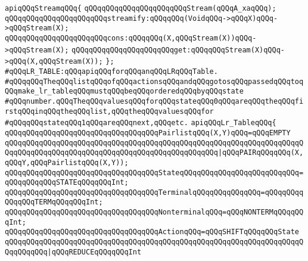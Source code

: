 \verb|apiqQQqStreamqQQq{|\newline
\newline
\verb|qQQqqQQqqQQqqQQqqQQqqQQqStream(qQQqA_xaqQQq);|\newline
\newline
\verb|qQQqqQQqqQQqqQQqqQQqqQQqstreamify:qQQqqQQq(VoidqQQq->qQQqX)qQQq->qQQqStream(X);|\newline
\verb|qQQqqQQqqQQqqQQqqQQqqQQqcons:qQQqqQQq(X,qQQqStream(X))qQQq->qQQqStream(X);|\newline
\verb|qQQqqQQqqQQqqQQqqQQqqQQqget:qQQqqQQqStream(X)qQQq->qQQq(X,qQQqStream(X));|\newline
\verb|};|\newline
\newline
\verb|#qQQqLR_TABLE:qQQqapiqQQqforqQQqanqQQqLRqQQqTable.|\newline
\verb|#qQQqqQQqTheqQQqlistqQQqofqQQqactionsqQQqandqQQqgotosqQQqpassedqQQqtoqQQqmake_lr_tableqQQqmustqQQqbeqQQqorderedqQQqbyqQQqstate|\newline
\verb|#qQQqnumber.qQQqTheqQQqvaluesqQQqforqQQqstateqQQq0qQQqareqQQqtheqQQqfirstqQQqinqQQqtheqQQqlist,qQQqtheqQQqvaluesqQQqfor|\newline
\verb|#qQQqqQQqstateqQQq1qQQqareqQQqnext,qQQqetc.|\newline
\newline
\newline
\verb|apiqQQqLr_TableqQQq{|\newline
\newline
\verb|qQQqqQQqqQQqqQQqqQQqqQQqqQQqqQQqqQQqPairlistqQQq(X,Y)qQQq=qQQqEMPTY|\newline
\verb|qQQqqQQqqQQqqQQqqQQqqQQqqQQqqQQqqQQqqQQqqQQqqQQqqQQqqQQqqQQqqQQqqQQqqQQqqQQqqQQqqQQqqQQqqQQqqQQqqQQqqQQqqQQqqQQqqQQqqQQq|\verb#|qQQqPAIRqQQqqQQq(X,qQQqY,qQQqPairlistqQQq(X,Y));#\newline
\newline
\verb|qQQqqQQqqQQqqQQqqQQqqQQqqQQqqQQqqQQqStateqQQqqQQqqQQqqQQqqQQqqQQqqQQq=qQQqqQQqqQQqSTATEqQQqqQQqInt;|\newline
\verb|qQQqqQQqqQQqqQQqqQQqqQQqqQQqqQQqqQQqTerminalqQQqqQQqqQQqqQQq=qQQqqQQqqQQqqQQqTERMqQQqqQQqInt;|\newline
\verb|qQQqqQQqqQQqqQQqqQQqqQQqqQQqqQQqqQQqNonterminalqQQq=qQQqNONTERMqQQqqQQqInt;|\newline
\newline
\verb|qQQqqQQqqQQqqQQqqQQqqQQqqQQqqQQqqQQqActionqQQq=qQQqSHIFTqQQqqQQqState|\newline
\verb|qQQqqQQqqQQqqQQqqQQqqQQqqQQqqQQqqQQqqQQqqQQqqQQqqQQqqQQqqQQqqQQqqQQqqQQqqQQqqQQq|\verb#|qQQqREDUCEqQQqqQQqInt#\newline
